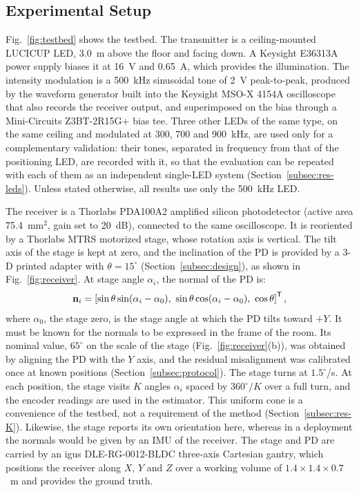 \subsection{Experimental Setup}
\label{subsec:hardware}
Fig.~\ref{fig:testbed} shows the testbed. The transmitter is a ceiling-mounted LUCICUP LED, 3.0~m above the floor and facing down. A Keysight E36313A power supply biases it at 16~V and 0.65~A, which provides the illumination. The intensity modulation is a 500~kHz sinusoidal tone of 2~V peak-to-peak, produced by the waveform generator built into the Keysight MSO-X 4154A oscilloscope that also records the receiver output, and superimposed on the bias through a Mini-Circuits Z3BT-2R15G+ bias tee. Three other LEDs of the same type, on the same ceiling and modulated at 300, 700 and 900~kHz, are used only for a complementary validation: their tones, separated in frequency from that of the positioning LED, are recorded with it, so that the evaluation can be repeated with each of them as an independent single-LED system (Section~\ref{subsec:res-leds}). Unless stated otherwise, all results use only the 500~kHz LED.

The receiver is a Thorlabs PDA100A2 amplified silicon photodetector (active area 75.4~mm$^2$, gain set to 20~dB), connected to the same oscilloscope. It is reoriented by a Thorlabs MTRS motorized stage, whose rotation axis is vertical. The tilt axis of the stage is kept at zero, and the inclination of the PD is provided by a \mbox{3-D} printed adapter with $\theta=15^\circ$ (Section~\ref{subsec:design}), as shown in Fig.~\ref{fig:receiver}. At stage angle $\alpha_i$, the normal of the PD is:
\begin{equation}
 \vect n_i=\left[\sin\theta\sin(\alpha_i-\alpha_0),\ \sin\theta\cos(\alpha_i-\alpha_0),\ \cos\theta\right]\trans,
 \label{eq:normal}
\end{equation}
where $\alpha_0$, the stage zero, is the stage angle at which the PD tilts toward $+Y$. It must be known for the normals to be expressed in the frame of the room. Its nominal value, $65^\circ$ on the scale of the stage (Fig.~\ref{fig:receiver}(b)), was obtained by aligning the PD with the $Y$ axis, and the residual misalignment was calibrated once at known positions (Section~\ref{subsec:protocol}). The stage turns at $1.5^\circ$/s. At each position, the stage visits $K$ angles $\alpha_i$ spaced by $360^\circ/K$ over a full turn, and the encoder readings are used in the estimator. This uniform cone is a convenience of the testbed, not a requirement of the method (Section~\ref{subsec:res-K}). Likewise, the stage reports its own orientation here, whereas in a deployment the normals would be given by an IMU of the receiver. The stage and PD are carried by an igus DLE-RG-0012-BLDC three-axis Cartesian gantry, which positions the receiver along $X$, $Y$ and $Z$ over a working volume of $1.4\times1.4\times0.7$~m and provides the ground truth.


